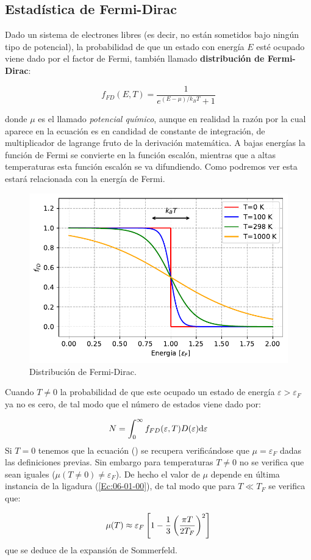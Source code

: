 \subsection{Estadística de Fermi-Dirac}

Dado un sistema de electrones libres (es decir, no están sometidos bajo ningún tipo de potencial), la probabilidad de que un estado con energía $E$ esté ocupado viene dado por el factor de Fermi, también llamado \textbf{distribución de Fermi-Dirac}:
\begin{mybox}\begin{equation}
	f_{FD} (E,T) = \dfrac{1}{e^{(E-\mu)/k_BT}+1}
\end{equation}\end{mybox}
donde $\mu$ es el llamado \textit{potencial químico}, aunque en realidad la razón por la cual aparece en la ecuación es en candidad de constante de integración, de multiplicador de lagrange fruto de la derivación matemática. A bajas energías la función de Fermi se convierte en la función escalón, mientras que a altas temperaturas esta función escalón se va difundiendo. Como podremos ver esta estará relacionada con la energía de Fermi.

\begin{figure}[h!] \centering
	\includegraphics[scale=0.85]{Cuerpo/Append_A/Fermi-Dirac.pdf}
	\caption{Distribución de Fermi-Dirac.}
	\label{Fig:06-0}
\end{figure}    
Cuando $T\neq0$ la probabilidad de que este ocupado un estado de energía $\varepsilon>\varepsilon_F$ ya no es cero, de tal modo que el número de estados viene dado por:

\begin{equation}
	N=\int_{0}^{\infty} f_{FD}(\varepsilon,T) D(\varepsilon) \mathrm{d} \varepsilon \label{Ec:06-01-00}
\end{equation}
Si $T=0$ tenemos que la ecuación () se recupera verificándose que $\mu=\varepsilon_F$ dadas las definiciones previas. Sin embargo para temperaturas $T\neq 0$ no se verifica que sean iguales ($\mu(T\neq 0) \neq \varepsilon_F$). De hecho el valor de $\mu$ depende en última instancia de la ligadura (\ref{Ec:06-01-00}), de tal modo que para $T\ll T_F$ se verifica que:

\begin{equation}
	\mu(T) \approx \varepsilon_F \left[ 1-\frac{1}{3}\left( \frac{\pi T}{2T_F} \right)^2 \right]
\end{equation}
que se deduce de la expansión de Sommerfeld.